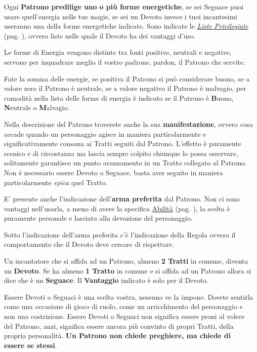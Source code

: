\begin{multicols}{2}
Ogni \textbf{Patrono predilige uno o più forme energetiche}, se sei Seguace puoi usare quell'energia nelle tue magie, se sei un Devoto invece i tuoi incantesimi useranno una della forme energetiche indicate. Sono indicate le \hyperlink{listeprivilegiate}{\emph{Liste Privilegiate}} (pag. \pageref{listeprivilegiate}), ovvero liste nelle quale il Devoto ha dei vantaggi d'uso.

Le forme di Energia vengono distinte tra fonti positive, neutrali e negative, servono per inquadrare meglio il vostro padrone, pardon, il Patrono che servite.

Fate la somma delle energie, se positiva il Patrono si può considerare buono, se a valore zero il Patrono è neutrale, se a valore negativo il Patrono è malvagio, per comodità nella lista delle forme di energia è indicato se il Patrono è \textbf{B}uono, \textbf{N}eutrale o \textbf{M}alvagio.

Nella descrizione del Patrono troverete anche la sua \textbf{manifestazione}, ovvero cosa accade quando un personaggio agisce in maniera particolarmente e significativamente consona ai Tratti seguiti dal Patrono. L'effetto è puramente scenico e di circostanza ma lascia sempre colpito chiunque lo possa osservare, solitamente garantisce un punto avanzamento in un Tratto collegato al Patrono. Non è necessario essere Devoto o Seguace, basta aver seguito in maniera particolarmente \emph{epica} quel Tratto.

E' presente anche l'indicazione dell'\textbf{arma preferita} dal Patrono. Non ci sono vantaggi nell'usarla, a meno di avere la specifica \hyperlink{Il Patrono è la mia Arma}{Abilità} (pag. \pageref{Il Patrono è la mia Arma}), la scelta è puramente personale e lasciata alla devozione del personaggio.

Sotto l'indicazione dell'arma preferita c'è l'indicazione della Regola  ovvero il comportamento che il Devoto deve cercare di rispettare.

Un incantatore che si affida ad un Patrono, almeno \textbf{2 Tratti} in comune, diventa un \textbf{Devoto}. Se ha almeno \textbf{1 Tratto} in comune e si affida ad un Patrono allora si dice che è un \textbf{Seguace}. Il \textbf{Vantaggio} indicato è solo per il Devoto.

\begin{changemargin}{0.3cm}{0.3cm}\begin{tcolorbox}[title = Devoti e Seguaci]
Essere Devoti o Seguaci è una scelta vostra, nessuno ve la impone. Dovete sentirla come una occasione di gioco di ruolo, come un arricchimento del personaggio e non una costrizione. Essere Devoti o Seguaci non significa essere proni al volere del Patrono, anzi, significa essere ancora più convinto di propri Tratti, della propria personalità. \textbf{Un Patrono non chiede preghiere, ma chiede di essere se stessi}.
\end{tcolorbox}\end{changemargin}


\end{multicols}

